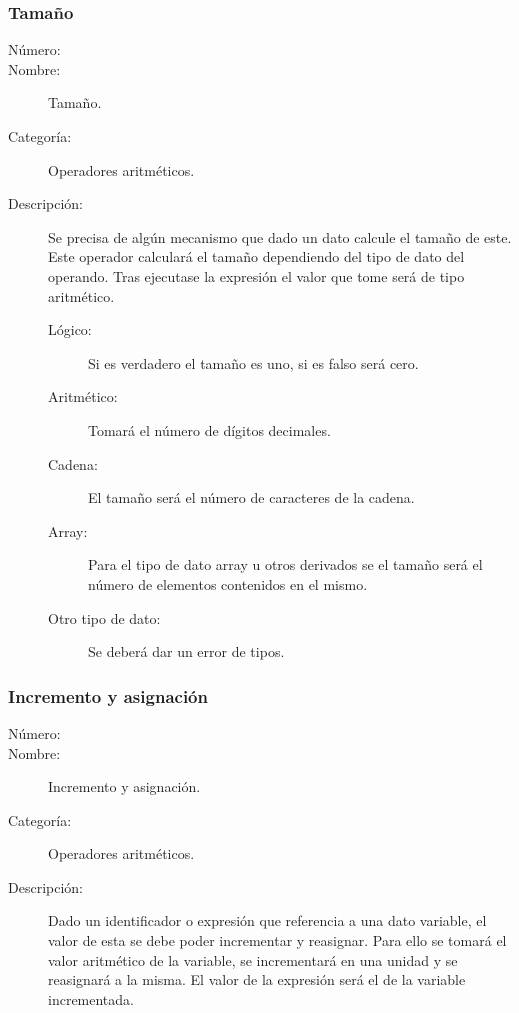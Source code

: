 \subsubsection{Tamaño}
\begin{framed}
	\begin{description}
		\item [Número:] \cn
		\item [Nombre:] Tamaño.
		\item [Categoría:] Operadores aritméticos.
		\item [Descripción:] Se precisa de algún mecanismo que dado un dato calcule el tamaño de este. Este operador calculará el
		tamaño dependiendo del tipo de dato del operando. Tras ejecutase la expresión el valor que tome será de tipo aritmético.
		\begin{description}
			\item[Lógico:] Si es verdadero el tamaño es uno, si es falso será cero.
			\item[Aritmético:] Tomará el número de dígitos decimales.
			\item[Cadena:] El tamaño será el número de caracteres de la cadena.
			\item[Array:] Para el tipo de dato array u otros derivados se el tamaño será el número de elementos contenidos en el mismo.
			\item[Otro tipo de dato:] Se deberá dar un error de tipos.
		\end{description}
	\end {description}
\end{framed}

\subsubsection{Incremento y asignación}
\begin{framed}
	\begin{description}
		\item [Número:] \cn
		\item [Nombre:] Incremento y asignación.
		\item [Categoría:] Operadores aritméticos.
		\item [Descripción:] Dado un identificador o expresión que referencia a una dato variable, el valor de esta se debe poder incrementar y
		reasignar. Para ello se tomará el valor aritmético de la variable, se incrementará en una unidad y se reasignará a la misma.
		El valor de la expresión será el de la variable incrementada.
	\end {description}
\end{framed}

